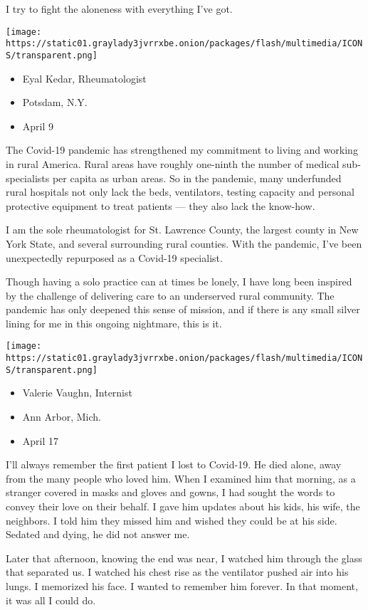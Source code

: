 I try to fight the aloneness with everything I've got.

\texttt{[image: https://static01.graylady3jvrrxbe.onion/packages/flash/multimedia/ICONS/transparent.png]}

\begin{itemize}
\tightlist
\item
  Eyal Kedar, Rheumatologist
\item
  Potsdam, N.Y.
\item
  April 9
\end{itemize}

The Covid-19 pandemic has strengthened my commitment to living and
working in rural America. Rural areas have roughly one-ninth the number
of medical sub-specialists per capita as urban areas. So in the
pandemic, many underfunded rural hospitals not only lack the beds,
ventilators, testing capacity and personal protective equipment to treat
patients --- they also lack the know-how.

I am the sole rheumatologist for St. Lawrence County, the largest county
in New York State, and several surrounding rural counties. With the
pandemic, I've been unexpectedly repurposed as a Covid-19 specialist.

Though having a solo practice can at times be lonely, I have long been
inspired by the challenge of delivering care to an underserved rural
community. The pandemic has only deepened this sense of mission, and if
there is any small silver lining for me in this ongoing nightmare, this
is it.

\texttt{[image: https://static01.graylady3jvrrxbe.onion/packages/flash/multimedia/ICONS/transparent.png]}

\begin{itemize}
\tightlist
\item
  Valerie Vaughn, Internist
\item
  Ann Arbor, Mich.
\item
  April 17
\end{itemize}

I'll always remember the first patient I lost to Covid-19. He died
alone, away from the many people who loved him. When I examined him that
morning, as a stranger covered in masks and gloves and gowns, I had
sought the words to convey their love on their behalf. I gave him
updates about his kids, his wife, the neighbors. I told him they missed
him and wished they could be at his side. Sedated and dying, he did not
answer me.

Later that afternoon, knowing the end was near, I watched him through
the glass that separated us. I watched his chest rise as the ventilator
pushed air into his lungs. I memorized his face. I wanted to remember
him forever. In that moment, it was all I could do.

